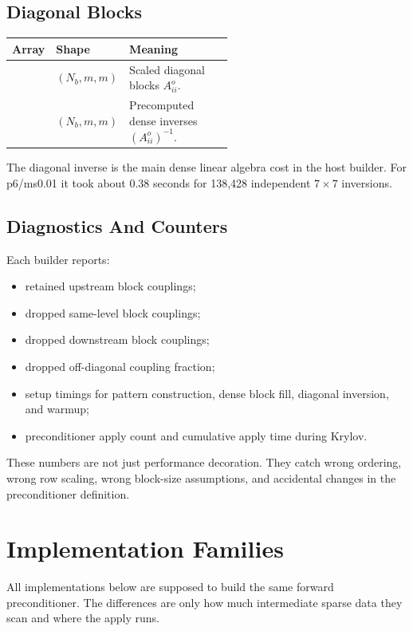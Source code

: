 \documentclass[11pt]{article}
\newcommand{\code}[1]{\texttt{\detokenize{#1}}}
\begin{document}
\subsection{Diagonal Blocks}

\begin{center}
\begin{tabular}{llp{0.55\linewidth}}
\toprule
Array & Shape & Meaning \\
\midrule
\code{diagonal_blocks} & \((N_b,m,m)\) & Scaled diagonal blocks \(A^o_{ii}\). \\
\code{diagonal_inverse} & \((N_b,m,m)\) & Precomputed dense inverses \((A^o_{ii})^{-1}\). \\
\bottomrule
\end{tabular}
\end{center}

The diagonal inverse is the main dense linear algebra cost in the host
builder.  For p6/ms0.01 it took about 0.38 seconds for 138,428 independent
\(7\times7\) inversions.

\subsection{Diagnostics And Counters}

Each builder reports:
\begin{itemize}[nosep]
  \item retained upstream block couplings;
  \item dropped same-level block couplings;
  \item dropped downstream block couplings;
  \item dropped off-diagonal coupling fraction;
  \item setup timings for pattern construction, dense block fill, diagonal
        inversion, and warmup;
  \item preconditioner apply count and cumulative apply time during Krylov.
\end{itemize}
These numbers are not just performance decoration.  They catch wrong ordering,
wrong row scaling, wrong block-size assumptions, and accidental changes in the
preconditioner definition.

\section{Implementation Families}
\label{sec:implementations}

All implementations below are supposed to build the same forward
preconditioner.  The differences are only how much intermediate sparse data
they scan and where the apply runs.
\end{document}
